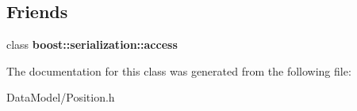 \subsection*{Friends}
\begin{DoxyCompactItemize}
\item 
\hypertarget{classPosition_ac98d07dd8f7b70e16ccb9a01abf56b9c}{
class {\bfseries boost::serialization::access}}
\label{classPosition_ac98d07dd8f7b70e16ccb9a01abf56b9c}

\end{DoxyCompactItemize}


The documentation for this class was generated from the following file:\begin{DoxyCompactItemize}
\item 
DataModel/Position.h\end{DoxyCompactItemize}
